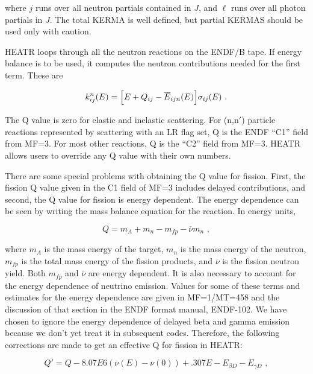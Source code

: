 \noindent
where $j$ runs over all neutron partials contained in $J$, and
$\ell$ runs over all photon partials in $J$.  The total KERMA is
well defined, but partial KERMAS should be used only with caution.

HEATR loops through all the neutron reactions on the ENDF/B tape.
If energy balance is to be used, it computes the neutron
contributions needed for the first term.  These are

\begin{equation}
   k_{ij}^n(E)=
    \Bigl[E+Q_{ij}-\overline{E}_{ijn}(E)\Bigr]\sigma_{ij}(E)\,\,.
\label{nkerm}
\end{equation}
\vspace{0.5 pt}

The Q value is zero for elastic and inelastic scattering.  For
(n,n$'$) particle reactions represented by scattering with an
LR flag set, Q is the ENDF ``C1'' field from MF=3.  For most
other reactions, Q is the ``C2'' field from MF=3.  HEATR allows
users to override any Q value with their own numbers.

There are some special problems with obtaining the Q value for
fission.  First, the fission Q value given in
the C1 field of MF=3 includes delayed contributions, and second,
the Q value for fission is energy dependent.  The energy dependence
can be seen by writing the mass balance equation for the reaction.
In energy units,

\begin{equation}
  Q = m_A + m_n - m_{fp} - \overline{\nu}m_n\,\,,
\end{equation}
\vspace{0.5 pt}

\noindent
where $m_A$ is the mass energy of the target, $m_n$ is the mass
energy of the neutron, $m_{fp}$ is the total mass energy of the
fission products, and $\overline{\nu}$ is the fission neutron
yield.  Both $m_{fp}$ and $\overline{\nu}$ are energy dependent.
It is also necessary to account for the energy dependence of
neutrino emission.  Values for some of these terms and
estimates for the energy dependence are given in MF=1/MT=458 and
the discussion of that section in the ENDF format manual,
ENDF-102\cite{ENDF102}.  We have chosen
to ignore the energy dependence of delayed beta and gamma
emission because we don't yet treat it in subsequent codes.
Therefore, the following corrections are made to get an
effective Q for fission in HEATR:

\begin{equation}
  Q'=Q-8.07E6(\overline{\nu}(E)-\overline{\nu}(0))+.307E
   -E_{\beta D}-E_{\gamma D}\,\,,
\end{equation}

